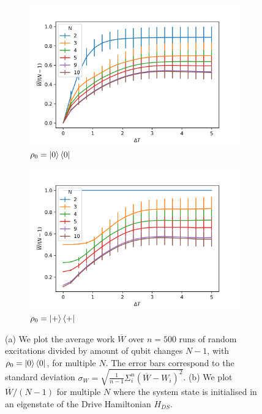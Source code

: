 \begin{figure}
	\centering
	\begin{subfigure}{0.4\textwidth}
		\centering
		\includegraphics[width=\textwidth]{img/dt_0}
		\caption{$\rho_0 = \ket{0}\bra{0}$}
		\label{dt_0}
	\end{subfigure}
	\begin{subfigure}{0.4\textwidth}
	\centering
	\includegraphics[width=\textwidth]{img/dt_eigen}
	\caption{$\rho_0 = \ket{+}\bra{+}$}
	\label{dt_eigen}
	\end{subfigure}
	\caption{(a) We plot the average work $\overline{W}$ over $n = 500$ runs of random excitations divided by amount of qubit changes $N - 1$, with $\rho_0 = \ket{0}\bra{0}$, for multiple $N$. The error bars correspond to the standard deviation $\sigma_{W} = \sqrt{\frac{1}{n-1} \Sigma_i^n (\overline{W} - W_i)^2}$.
	(b) We plot $\overline{W}/(N-1)$ for multiple $N$ where the system state is initialised in an eigenstate of the Drive Hamiltonian $H_{DS}$.}
	\label{dt_dep}
\end{figure}
